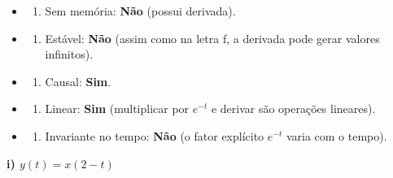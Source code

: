 \begin{itemize}
\tightlist
\item
  \begin{enumerate}
  \def\labelenumi{(\roman{enumi})}
  \tightlist
  \item
    Sem memória: \textbf{Não} (possui derivada).
  \end{enumerate}
\item
  \begin{enumerate}
  \def\labelenumi{(\roman{enumi})}
  \setcounter{enumi}{1}
  \tightlist
  \item
    Estável: \textbf{Não} (assim como na letra f, a derivada pode gerar valores infinitos).
  \end{enumerate}
\item
  \begin{enumerate}
  \def\labelenumi{(\roman{enumi})}
  \setcounter{enumi}{2}
  \tightlist
  \item
    Causal: \textbf{Sim}.
  \end{enumerate}
\item
  \begin{enumerate}
  \def\labelenumi{(\roman{enumi})}
  \setcounter{enumi}{3}
  \tightlist
  \item
    Linear: \textbf{Sim} (multiplicar por \(e^{-t}\) e derivar são operações lineares).
  \end{enumerate}
\item
  \begin{enumerate}
  \def\labelenumi{(\alph{enumi})}
  \setcounter{enumi}{21}
  \tightlist
  \item
    Invariante no tempo: \textbf{Não} (o fator explícito \(e^{-t}\) varia com o tempo).
  \end{enumerate}
\end{itemize}

\textbf{i) \(y(t) = x(2-t)\)}

